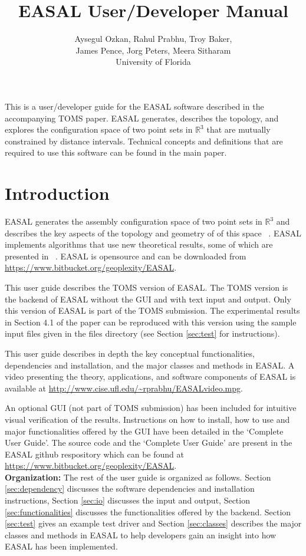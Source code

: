 \documentclass[10pt]{article}
\title{EASAL User/Developer Manual}
\author{Aysegul Ozkan, Rahul Prabhu, Troy Baker, \\James Pence, Jorg
Peters, Meera Sitharam \\ University of Florida}
\begin{document}
\maketitle
This is a user/developer guide for the EASAL software described in the
accompanying TOMS paper.
EASAL generates, describes the topology, and explores the configuration space 
of two point sets in $\mathbb{R}^3$ that are mutually constrained by
distance intervals. Technical concepts and definitions that are required to use
this software can be found in the main paper.


\section{Introduction}
\label{sec:intro}
EASAL generates the assembly configuration space of two point sets in $\mathbb{R}^3$
and describes the key aspects of the topology and geometry of of this space
~\cite{Sitharam:2012:EASAL, Ozkan2014MainEasal, Wu2014Virus}.
EASAL implements
algorithms that use new theoretical results, some of which are presented in
~\cite{Ozkan2014MainEasal, SiGa:2010, Sitharam:2012:EASAL}.  
EASAL is opensource and can be downloaded from
\url{https://www.bitbucket.org/geoplexity/EASAL}.  

This user guide describes the TOMS version of EASAL.
The TOMS version is the backend of EASAL
without the GUI and with text input and output. Only this version of
EASAL is part of the TOMS submission. 
The experimental results in Section 4.1 of the paper can be reproduced
with this version using the sample input files given in the files directory 
(see Section \ref{sec:test} for instructions).


This user guide describes in depth the key conceptual functionalities,
dependencies and installation, and the major classes and methods in EASAL.  
A video presenting the theory, applications, and software components of
EASAL is available at \url{http://www.cise.ufl.edu/~rprabhu/EASALvideo.mpg}.

An optional GUI (not part of TOMS submission) has been included for intuitive
visual verification of the results.  Instructions on how to install, how to use
and major functionalities offered by the GUI have been detailed in the
`Complete User Guide'. The source code and the `Complete User Guide' are
present in the EASAL github respository which can be found at
\url{https://www.bitbucket.org/geoplexity/EASAL}.\\ 


\noindent\textbf{Organization:} 
The rest of the user guide is organized as follows.
Section \ref{sec:dependency} discusses the software dependencies and
installation instructions, Section \ref{sec:io} discusses the input and output,
Section \ref{sec:functionalities} discusses the functionalities offered by the
backend. Section \ref{sec:test} gives an example test driver and Section
\ref{sec:classes} describes the major classes and methods in EASAL to help
developers gain an insight into how EASAL has been implemented.
\end{document}

